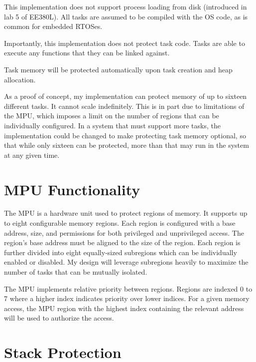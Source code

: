 This implementation does not support process loading from disk (introduced in lab 5 of EE380L). All tasks are assumed to be compiled with the OS code, as is common for embedded RTOSes.

Importantly, this implementation does not protect task code. Tasks are able to execute any functions that they can be linked against. 

Task memory will be protected automatically upon task creation and heap allocation.


As a proof of concept, my implementation can protect memory of up to sixteen different tasks. It cannot scale indefinitely. This is in part due to limitations of the MPU, which imposes a limit on the number of regions that can be individually configured. In a system that must support more tasks, the implementation could be changed to make protecting task memory optional, so that while only sixteen can be protected, more than that may run in the system at any given time.

\section{MPU Functionality}

The MPU is a hardware unit used to protect regions of memory. It supports up to eight configurable memory regions. Each region is configured with a base address, size, and permissions for both privileged and unprivileged access. The region's base address must be aligned to the size of the region. Each region is further divided into eight equally-sized subregions which can be individually enabled or disabled. My design will leverage subregions heavily to maximize the number of tasks that can be mutually isolated.

The MPU implements relative priority between regions. Regions are indexed 0 to 7 where a higher index indicates priority over lower indices. For a given memory access, the MPU region with the highest index containing the relevant address will be used to authorize the access.

\section{Stack Protection}

